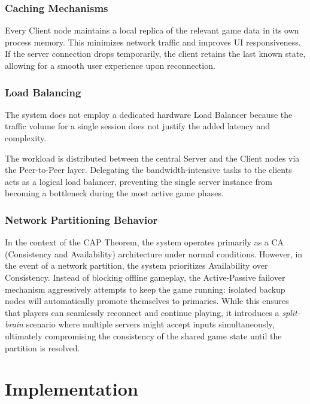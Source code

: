 \documentclass{scrartcl}
\begin{document}
\subsubsection*{Caching Mechanisms}

Every Client node maintains a local replica of the relevant game data in its own process memory.
This minimizes network traffic and improves UI responsiveness.
If the server connection drops temporarily, the client retains the last known state, 
allowing for a smooth user experience upon reconnection.

\subsubsection*{Load Balancing}

The system does not employ a dedicated hardware Load Balancer 
because the traffic volume for a single session does not justify 
the added latency and complexity.

The workload is distributed between the central Server and the Client nodes 
via the Peer-to-Peer layer.
Delegating the bandwidth-intensive tasks to the clients acts as a 
logical load balancer, 
preventing the single server instance from becoming a bottleneck 
during the most active game phases.

\subsubsection*{Network Partitioning Behavior}

In the context of the CAP Theorem, the system operates primarily as a CA (Consistency and Availability) architecture under normal conditions. 
However, in the event of a network partition, the system prioritizes Availability over Consistency. 
Instead of blocking offline gameplay, the Active-Passive failover mechanism aggressively attempts to keep the game running: 
isolated backup nodes will automatically promote themselves to primaries. 
While this ensures that players can seamlessly reconnect and continue playing, it introduces a \textit{split-brain} scenario where multiple servers might accept inputs simultaneously, 
ultimately compromising the consistency of the shared game state until the partition is resolved.

\section{Implementation}\label{implementation}
\end{document}
